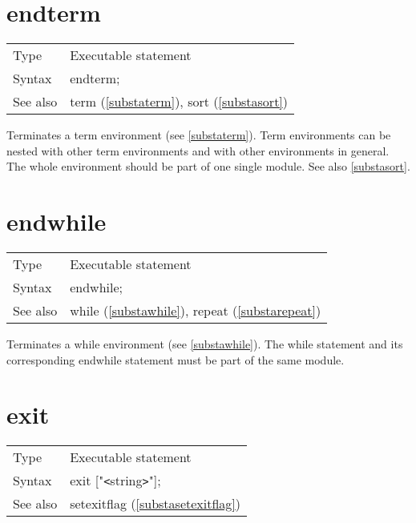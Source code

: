 
\section{endterm}
\label{substaendterm}

\noindent \begin{tabular}{ll}
Type & Executable statement\\
Syntax & endterm;
\\ See also & term (\ref{substaterm}), sort (\ref{substasort})
\end{tabular} \vspace{4mm}

\noindent Terminates a term environment 
(see \ref{substaterm}). Term environments can be nested with 
other term environments and with other environments in general. The whole 
environment should be part of one single module. See also \ref{substasort}. 
\vspace{10mm}


\section{endwhile}
\label{substaendwhile}

\noindent \begin{tabular}{ll}
Type & Executable statement\\
Syntax & endwhile;
\\ See also & while (\ref{substawhile}), repeat (\ref{substarepeat})
\end{tabular} \vspace{4mm}

\noindent Terminates a while environment (see \ref{substawhile}). The while 
statement and its corresponding endwhile statement must be part of the same 
module. \vspace{10mm}


\section{exit}
\label{substaexit}

\noindent \begin{tabular}{ll}
Type & Executable statement\\
Syntax & exit ["{\tt<}string{\tt>}"];
\\ See also & setexitflag (\ref{substasetexitflag})
\end{tabular} \vspace{4mm}

